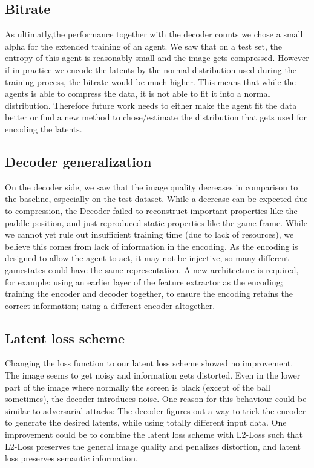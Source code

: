 \subsection{Bitrate}
As ultimatly,the performance together with the decoder counts we chose a small
alpha for the extended training of an agent. We saw that on a test set, the
entropy of this agent is reasonably small and the image gets compressed. However
if in practice we encode the latents by the normal distribution used during the
training process, the bitrate would be much higher. This means that while
the agents is able to compress the data, it is not able to fit it into a normal
distribution. Therefore future work needs to either make the agent fit the data
better or find a new method to chose/estimate the distribution that gets used
for encoding the latents.\\

\subsection{Decoder generalization}
On the decoder side, we saw that the image quality decreases in
comparison to the baseline, especially on the test dataset. While a decrease can
be expected due to compression, the Decoder failed to reconstruct important
properties like the paddle position, and just reproduced static properties like
the game frame. While we cannot yet rule out insufficient training time (due to
lack of resources), we believe this comes from lack of information in the
encoding. As the encoding is designed to allow the agent to act, it may not be
injective, so many different gamestates could have the same representation. A
new architecture is required, for example: using an earlier layer of the feature
extractor as the encoding; training the encoder and decoder together, to ensure
the encoding retains the correct information; using a different encoder
altogether.\\

\subsection{Latent loss scheme}
Changing the loss function to our latent loss scheme showed no improvement. The
image seems to get noisy and information gets distorted. Even in the lower part
of the image where normally the screen is black (except of the ball sometimes),
the decoder introduces noise. One reason for this behaviour could be similar to
adversarial attacks: The decoder figures out a way to trick the encoder to
generate the desired latents, while using totally different input data. One
improvement could be to combine the latent loss scheme with L2-Loss such that
L2-Loss preserves the general image quality and penalizes distortion,
and latent loss preserves semantic information.

